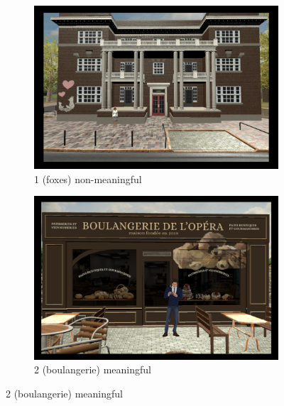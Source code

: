 \begin{figure}[!htb]
	\centering
	\begin{subfigure}[b]{0.48\linewidth}
		\includegraphics[width=\linewidth]{figures/starting_locations_appx/01_R(foxes)_A.PNG}
		\caption{1 (foxes) non-meaningful}
		\label{fig:01_R(foxes)_A}
	\end{subfigure}
	\begin{subfigure}[b]{0.48\linewidth}
		\includegraphics[width=\linewidth]{figures/starting_locations_appx/02_S(boulangerie)_A.PNG}
		\caption{2 (boulangerie) meaningful}
		\label{fig:02_S(boulangerie)_A}
	\end{subfigure}
	

\end{figure}
